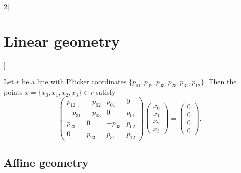 \documentclass[../../../main.tex]{subfiles}
\begin{document}
\begin{multicols}{2}[\section{Linear geometry}]
\begin{prop}
\end{prop}
\begin{prop}
Let $r$ be a line with Plücker coordinates $\{p_{01},p_{02},p_{03},p_{23},p_{31},p_{12}\}$. Then the points $x=\{x_0,x_1,x_2,x_3\}\in r$ satisfy $$\begin{pmatrix}
p_{12} & -p_{02} & p_{01} & 0 \\
-p_{31} & -p_{03} & 0 & p_{01} \\
p_{23} & 0 & -p_{03} & p_{02} \\
0 & p_{23} & p_{31} & p_{12} 
\end{pmatrix}\begin{pmatrix}
x_0\\
x_1\\
x_2\\
x_3
\end{pmatrix}=\begin{pmatrix}
0\\
0\\
0\\
0
\end{pmatrix}.$$
\end{prop}
\subsection{Affine geometry}

\end{multicols}
\end{document}
